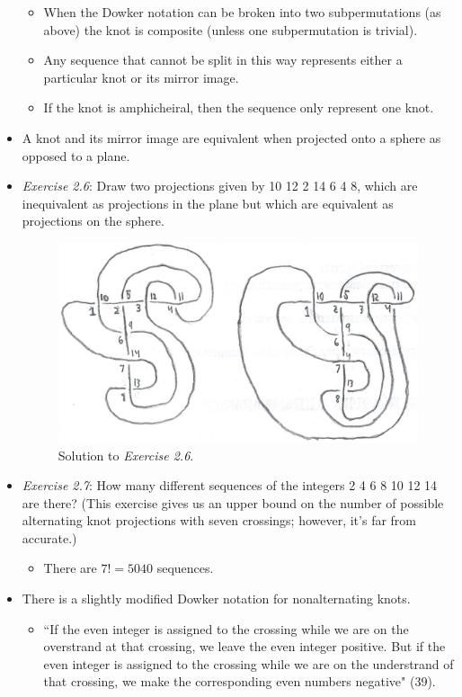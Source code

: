 \documentclass[titlepage]{article}
\numberwithin{figure}{section}
\numberwithin{table}{section}
\numberwithin{equation}{section}
\newcommand{\dq}[2]{``#1" (#2).}
\begin{document}
\begin{itemize}
\begin{itemize}
\begin{itemize}
        \end{itemize}
        \item When the Dowker notation can be broken into two subpermutations (as above) the knot is composite (unless one subpermutation is trivial).
        \item Any sequence that cannot be split in this way represents either a particular knot or its mirror image.
        \item If the knot is amphicheiral, then the sequence only represent one knot.
    \end{itemize}
    \item A knot and its mirror image are equivalent when projected onto a sphere as opposed to a plane.
    \item \emph{Exercise 2.6}: Draw two projections given by 10 12 2 14 6 4 8, which are inequivalent as projections in the plane but which are equivalent as projections on the sphere.
    \begin{figure}[h!]
        \centering
        \includegraphics[width=0.5\linewidth]{Blender/ex2-6.png}
        \caption{Solution to \emph{Exercise 2.6}.}
        \label{fig:ex2-6}
    \end{figure}
    \item \emph{Exercise 2.7}: How many different sequences of the integers 2 4 6 8 10 12 14 are there? (This exercise gives us an upper bound on the number of possible alternating knot projections with seven crossings; however, it's far from accurate.)
    \begin{itemize}
        \item There are $7!=5040$ sequences.
    \end{itemize}
    \item There is a slightly modified Dowker notation for nonalternating knots.
    \begin{itemize}
        \item \dq{If the even integer is assigned to the crossing while we are on the overstrand at that crossing, we leave the even integer positive. But if the even integer is assigned to the crossing while we are on the understrand of that crossing, we make the corresponding even numbers negative}{39}

\end{itemize}
\end{itemize}
\end{document}

